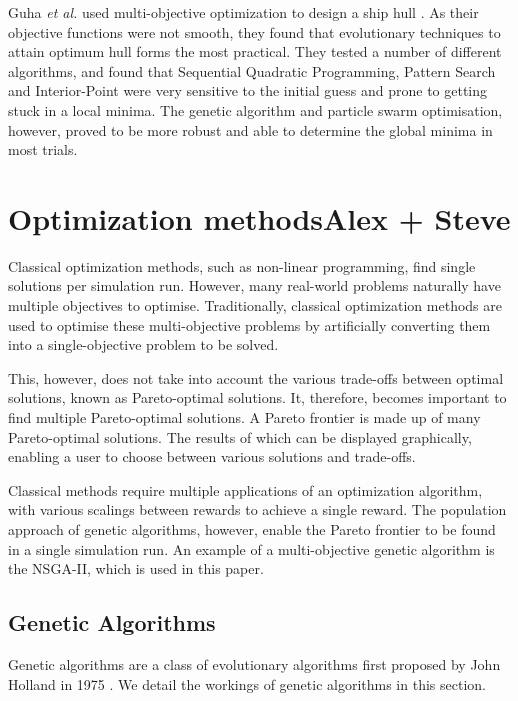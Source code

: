 \documentclass[10pt, conference, compsocconf]{IEEEtran}
\begin{document}
Guha \textit{et al.} used multi-objective optimization to design a ship hull \cite{Guha2015}. As their objective functions were not smooth, they found that evolutionary techniques to attain optimum hull forms the most practical. They tested a number of different algorithms, and found that Sequential Quadratic Programming, Pattern Search and Interior-Point were very sensitive to the initial guess and prone to getting stuck in a local minima. The genetic algorithm and particle swarm optimisation, however, proved to be more robust and able to determine the global minima in most trials.

\section{Optimization methods{\color{red}Alex + Steve}}
\label{method}

Classical optimization methods, such as non-linear programming, find single solutions per simulation run. However, many real-world problems naturally have multiple objectives to optimise. Traditionally, classical optimization methods are used to optimise these multi-objective problems by artificially converting them into a single-objective problem to be solved. 

This, however, does not take into account the various trade-offs between optimal solutions, known as Pareto-optimal solutions. It, therefore, becomes important to find multiple Pareto-optimal solutions. A Pareto frontier is made up of many Pareto-optimal solutions. The results of which can be displayed graphically, enabling a user to choose between various solutions and trade-offs.

Classical methods require multiple applications of an optimization algorithm, with various scalings between rewards to achieve a single reward. The population approach of genetic algorithms, however, enable the Pareto frontier to be found in a single simulation run. An example of a multi-objective genetic algorithm is the NSGA-II, which is used in this paper.

\subsection{Genetic Algorithms}

Genetic algorithms are a class of evolutionary algorithms first proposed by John Holland in 1975 \cite{Holland1975}. We detail the workings of genetic algorithms in this section.
\end{document}
